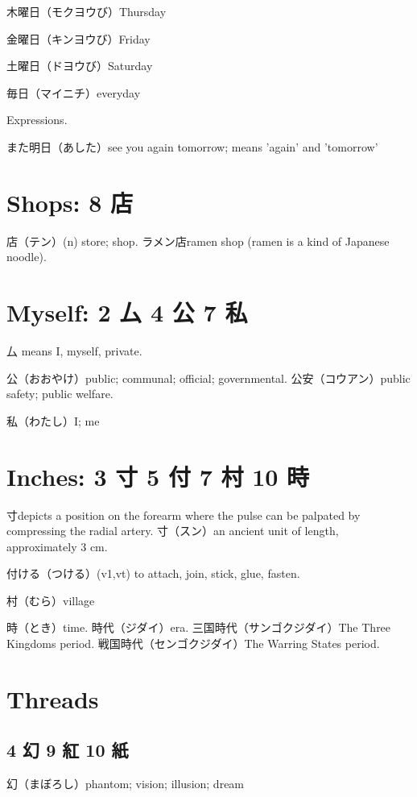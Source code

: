 木曜日（モクヨウび）Thursday

金曜日（キンヨウび）Friday

土曜日（ドヨウび）Saturday

毎日（マイニチ）everyday

Expressions.

また明日（あした）see you again tomorrow; means 'again' and 'tomorrow'

\section{Shops: 8 店}

店（テン）(n) store; shop.
ラメン店ramen shop (ramen is a kind of Japanese noodle).

\section{Myself: 2 厶 4 公 7 私}

厶 means I, myself, private.

公（おおやけ）public; communal; official; governmental.
公安（コウアン）public safety; public welfare.

私（わたし）I; me

\section{Inches: 3 寸 5 付 7 村 10 時}

寸depicts a position on the forearm
where the pulse can be palpated by compressing the radial artery.
寸（スン）an ancient unit of length, approximately 3 cm.

付ける（つける）(v1,vt) to attach, join, stick, glue, fasten.

村（むら）village

時（とき）time.
時代（ジダイ）era.
三国時代（サンゴクジダイ）The Three Kingdoms period.
戦国時代（センゴクジダイ）The Warring States period.

\section{Threads}

\subsection{4 幻 9 紅 10 紙}

幻（まぼろし）phantom; vision; illusion; dream

